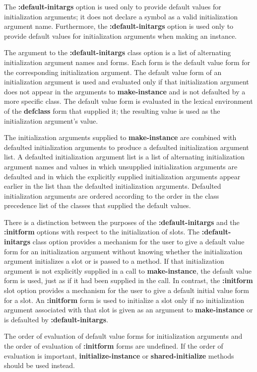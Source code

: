 The {\bf :default-initargs} option is used only to provide default
values for initialization arguments; it does not declare a symbol as a
valid initialization argument name.  Furthermore, the {\bf
:default-initargs} option is used only to provide default values for
initialization arguments when making an instance.

The argument to the {\bf :default-initargs} class option is a list of
alternating initialization argument names and forms.  Each form is the
default  value form for the corresponding initialization
argument.  The default  value form of an initialization
argument is used and evaluated only if that initialization argument
does not appear in the arguments to {\bf make-instance} and is not
defaulted by a more specific class.  The default  value form is
evaluated in the lexical environment of the {\bf defclass} form that
supplied it; the resulting value is used as the initialization
argument's value.

The initialization arguments supplied to {\bf make-instance} are combined
with defaulted initialization arguments to produce a {\bit
defaulted initialization argument list}. A defaulted initialization
argument list is a list of alternating initialization argument names and
values in which unsupplied initialization arguments are defaulted and in
which the explicitly supplied initialization arguments appear earlier in
the list than the defaulted initialization arguments.  Defaulted
initialization arguments are ordered according to the order in the class
precedence list of the classes that supplied the default values.

There is a distinction between the purposes of the {\bf
:default-initargs} and the {\bf :initform} options with respect to the
initialization of slots.  The {\bf :default-initargs} class option
provides a mechanism for the user to give a default  value form
for an initialization argument without knowing whether the
initialization argument initializes a slot or is passed to a method.
If that initialization argument is not explicitly supplied in a call
to {\bf make-instance}, the default  value form is used, just
as if it had been supplied in the call.  In contrast, the {\bf
:initform} slot option provides a mechanism for the user to give a
default initial value form for a slot.  An {\bf :initform} form is
used to initialize a slot only if no initialization argument
associated with that slot is given as an argument to {\bf
make-instance} or is defaulted by {\bf :default-initargs}.

The order of evaluation of default value forms for initialization
arguments and the order of evaluation of {\bf :initform} forms are
undefined.  If the order of evaluation is important, {\bf
initialize-instance} or {\bf shared-initialize} methods should be used
instead.

